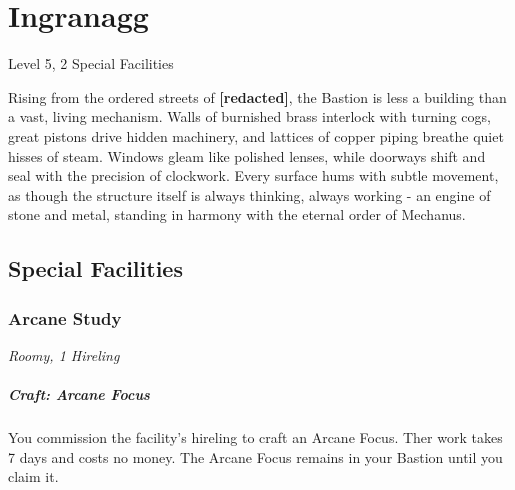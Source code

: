 \chapter*{Ingranagg}
{\vspace*{-3em}\entryfont\footnotesize Level 5, 2 Special Facilities}

%

{\entryfont\noindent Rising from the ordered streets of \textbf{[redacted]}, the Bastion is less a building than a vast, living mechanism. Walls of burnished brass interlock with turning cogs, great pistons drive hidden machinery, and lattices of copper piping breathe quiet hisses of steam. Windows gleam like polished lenses, while doorways shift and seal with the precision of clockwork. Every surface hums with subtle movement, as though the structure itself is always thinking, always working - an engine of stone and metal, standing in harmony with the eternal order of Mechanus.}

\section*{Special Facilities}
\subsection*{ Arcane Study}
{\textit{Roomy, 1 Hireling}}

{\entryfont \paragraph*{Craft: Arcane Focus} You commission the facility's hireling to craft an Arcane Focus. Ther work takes 7 days and costs no money. The Arcane Focus remains in your Bastion until you claim it.}

